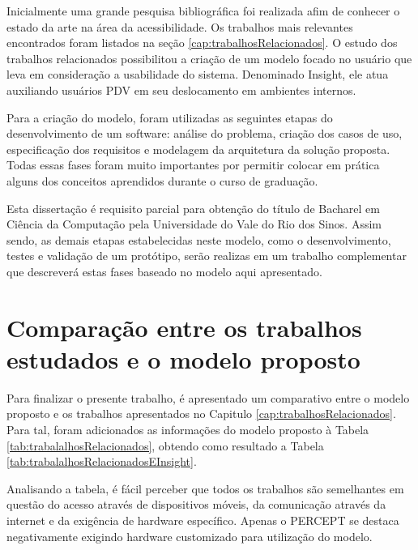 \documentclass[english,brazilian]{UNISINOSmonografia}
\begin{document}
Inicialmente uma grande pesquisa bibliográfica foi realizada afim de conhecer o estado da arte na área da acessibilidade. Os trabalhos mais relevantes encontrados foram listados na seção \ref{cap:trabalhosRelacionados}. O estudo dos trabalhos relacionados possibilitou a criação de um modelo focado no usuário que leva em consideração a usabilidade do sistema. Denominado Insight, ele atua auxiliando usuários PDV em seu deslocamento em ambientes internos. 

Para a criação do modelo, foram utilizadas as seguintes etapas do desenvolvimento de um software: análise do problema, criação dos casos de uso, especificação dos requisitos e modelagem da arquitetura da solução proposta. Todas essas fases foram muito importantes por permitir colocar em prática alguns dos conceitos aprendidos durante o curso de graduação.

Esta dissertação é requisito parcial para obtenção do título de Bacharel em Ciência da Computação pela Universidade do Vale do Rio dos Sinos. Assim sendo, as demais etapas estabelecidas neste modelo, como o desenvolvimento, testes e validação de um protótipo, serão realizas em um trabalho complementar que descreverá estas fases baseado no modelo aqui apresentado.

\section{Comparação entre os trabalhos estudados e o modelo proposto}
Para finalizar o presente trabalho, é apresentado um comparativo entre o modelo proposto e os trabalhos apresentados no Capitulo \ref{cap:trabalhosRelacionados}. Para tal, foram adicionados as informações do modelo proposto à Tabela \ref{tab:trabalalhosRelacionados}, obtendo como resultado a Tabela \ref{tab:trabalalhosRelacionadosEInsight}.

Analisando a tabela, é fácil perceber que todos os trabalhos são semelhantes em questão do acesso através de dispositivos móveis, da comunicação através da internet e da exigência de hardware específico. Apenas o PERCEPT se destaca negativamente exigindo hardware customizado para utilização do modelo.
\end{document}
